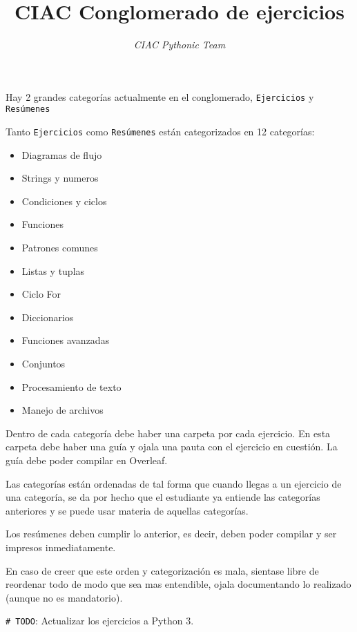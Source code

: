 \documentclass{article}
\title{CIAC Conglomerado de ejercicios}
\author{\textit{CIAC Pythonic Team}}
\date{}
\begin{document}
\maketitle

Hay 2 grandes categorías actualmente en el conglomerado, \texttt{Ejercicios} y \texttt{Resúmenes}

Tanto \texttt{Ejercicios} como \texttt{Resúmenes} están categorizados en 12 categorías:

\begin{itemize}
    \item Diagramas de flujo
    \item Strings y numeros
    \item Condiciones y ciclos
    \item Funciones
    \item Patrones comunes
    \item Listas y tuplas
    \item Ciclo For
    \item Diccionarios
    \item Funciones avanzadas
    \item Conjuntos
    \item Procesamiento de texto
    \item Manejo de archivos
\end{itemize}

Dentro de cada categoría debe haber una carpeta por cada ejercicio. En esta carpeta debe haber una guía y ojala una pauta con el ejercicio en cuestión. La guía debe poder compilar en Overleaf.

Las categorías están ordenadas de tal forma que cuando llegas a un ejercicio de una categoría, se da por hecho que el estudiante ya entiende las categorías anteriores y se puede usar materia de aquellas categorías.

Los resúmenes deben cumplir lo anterior, es decir, deben poder compilar y ser impresos inmediatamente.

En caso de creer que este orden y categorización es mala, sientase libre de reordenar todo de modo que sea mas entendible, ojala documentando lo realizado (aunque no es mandatorio).

\texttt{\# TODO}: Actualizar los ejercicios a Python 3.
\end{document}
